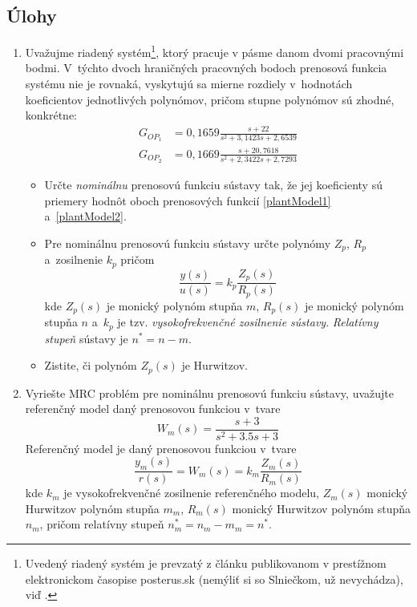 \documentclass[a4paper, 10pt, ]{article}
\begin{document}
\subsection{Úlohy}


\begin{enumerate}[leftmargin=0pt, labelsep=4mm, itemsep=0pt]

    \item Uvažujme riadený systém\footnote{Uvedený riadený systém je prevzatý z článku publikovanom v prestížnom elektronickom časopise posterus.sk (nemýliť si so Slniečkom, už nevychádza), viď \cite{Tar11}.}, ktorý pracuje v pásme danom dvomi pracovnými bodmi. V~týchto dvoch hraničných pracovných bodoch prenosová funkcia systému nie je rovnaká, vyskytujú sa mierne rozdiely v~hodnotách koeficientov jednotlivých polynómov, pričom stupne polynómov sú zhodné, konkrétne:
    \begin{align}
    	G_{OP_1} &= 0,1659 \frac{s + 22}{ s^2 + 3,1423 s + 2,6539} 	\label{plantModel1}\\
    	G_{OP_2} &= 0,1669 \frac{s + 20,7618}{s^2 + 2,3422s + 2,7293} \label{plantModel2}
    \end{align}
    \begin{itemize}[leftmargin=0pt, labelsep=4mm, itemsep=0pt]
    	\item Určte \emph{nominálnu} prenosovú funkciu sústavy tak, že jej koeficienty sú priemery hodnôt oboch prenosových funkcií \eqref{plantModel1} a~\eqref{plantModel2}.

    	\item Pre nominálnu prenosovú funkciu sústavy určte polynómy $Z_p$, $R_p$ a~zosilnenie $k_p$ pričom
    	\begin{equation} \label{C_PFsustavy_MRCp}
    	       \frac{y(s)}{u(s)} = k_p \frac{Z_p(s)}{R_p(s)}
        \end{equation}
        kde $Z_p(s)$ je monický  polynóm stupňa $m$, $R_p(s)$ je monický polynóm stupňa $n$ a~$k_p$ je tzv. \emph{vysokofrekvenčné zosilnenie sústavy}. \emph{Relatívny stupeň} sústavy je $n^* = n - m$.

        \item Zistite, či polynóm $Z_p(s)$ je Hurwitzov.
    \end{itemize}



    \item Vyriešte MRC problém pre nominálnu prenosovú funkciu sústavy, uvažujte referenčný model daný prenosovou funkciou v~tvare
    \begin{equation}
    	W_m(s) = \frac{s + 3}{ s^2 + 3.5 s + 3}
    \end{equation}
    Referenčný model je daný prenosovou funkciou v~tvare
    \begin{equation} \label{C_RefModelMRCp}
    	\frac{y_m(s)}{r(s)} = W_m(s) = k_m \frac{Z_m(s)}{R_m(s)}
    \end{equation}
    kde $k_m$ je vysokofrekvenčné zosilnenie referenčného modelu, $Z_m(s)$ monický Hurwitzov polynóm stupňa $m_m$, $R_m(s)$ monický Hurwitzov polynóm stupňa $n_m$, pričom relatívny stupeň $n^*_m = n_m - m_m = n^*$.


\end{enumerate}
\end{document}
